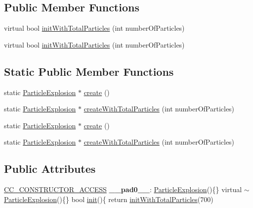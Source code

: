 \subsection*{Public Member Functions}
\begin{DoxyCompactItemize}
\item 
virtual bool \hyperlink{classParticleExplosion_a9f9b10a10eb9591beb51ac0fd150ab36}{init\+With\+Total\+Particles} (int number\+Of\+Particles)
\item 
virtual bool \hyperlink{classParticleExplosion_a0264fc392403902fb6077d711533bd19}{init\+With\+Total\+Particles} (int number\+Of\+Particles)
\end{DoxyCompactItemize}
\subsection*{Static Public Member Functions}
\begin{DoxyCompactItemize}
\item 
static \hyperlink{classParticleExplosion}{Particle\+Explosion} $\ast$ \hyperlink{classParticleExplosion_a9b7e6d03b2119876c653df67be08918b}{create} ()
\item 
static \hyperlink{classParticleExplosion}{Particle\+Explosion} $\ast$ \hyperlink{classParticleExplosion_abfa9a2a4890de46a735a208d79175395}{create\+With\+Total\+Particles} (int number\+Of\+Particles)
\item 
static \hyperlink{classParticleExplosion}{Particle\+Explosion} $\ast$ \hyperlink{classParticleExplosion_a90b26ce031c26771bcfa489ba87839fe}{create} ()
\item 
static \hyperlink{classParticleExplosion}{Particle\+Explosion} $\ast$ \hyperlink{classParticleExplosion_af619deccf9dfa214cd27d70b0651131f}{create\+With\+Total\+Particles} (int number\+Of\+Particles)
\end{DoxyCompactItemize}
\subsection*{Public Attributes}
\begin{DoxyCompactItemize}
\item 
\mbox{\label{classParticleExplosion_ab28ad61d41dc3f507cecfefa25dbec98}} 
\hyperlink{_2cocos2d_2cocos_2base_2ccConfig_8h_a25ef1314f97c35a2ed3d029b0ead6da0}{C\+C\+\_\+\+C\+O\+N\+S\+T\+R\+U\+C\+T\+O\+R\+\_\+\+A\+C\+C\+E\+SS} {\bfseries \+\_\+\+\_\+pad0\+\_\+\+\_\+}\+: \hyperlink{classParticleExplosion}{Particle\+Explosion}()\{\} virtual $\sim$\hyperlink{classParticleExplosion}{Particle\+Explosion}()\{\} bool \hyperlink{classParticleSystem_a65c05b30432f6e8aeb45ba018f3a8d3f}{init}()\{ return \hyperlink{classParticleExplosion_a9f9b10a10eb9591beb51ac0fd150ab36}{init\+With\+Total\+Particles}(700)
\end{DoxyCompactItemize}
